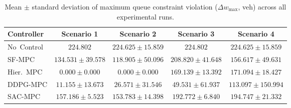 \begin{table}[htbp]
\centering
\caption{Mean $\pm$ standard deviation of maximum queue constraint violation ($\Delta w_{\max}$, veh) across all experimental runs.}
\label{tab:dw_max_comparison}
\begin{tabular}{lcccc}
\toprule
Controller & Scenario 1 & Scenario 2 & Scenario 3 & Scenario 4 \\
\midrule
No~Control & $224.802$ & $224.625 \pm 15.859$ & $224.802$ & $224.625 \pm 15.859$ \\
SF-MPC & $134.531 \pm 39.578$ & $118.905 \pm 50.096$ & $208.820 \pm 41.648$ & $156.617 \pm 49.631$ \\
Hier.~MPC & $0.000 \pm 0.000$ & $0.000 \pm 0.000$ & $169.139 \pm 13.392$ & $171.094 \pm 18.427$ \\
DDPG-MPC & $11.155 \pm 13.673$ & $26.571 \pm 31.546$ & $49.531 \pm 61.937$ & $113.097 \pm 150.994$ \\
SAC-MPC & $157.186 \pm 5.523$ & $153.783 \pm 14.398$ & $192.772 \pm 6.840$ & $194.747 \pm 21.332$ \\
\bottomrule
\end{tabular}
\end{table}
